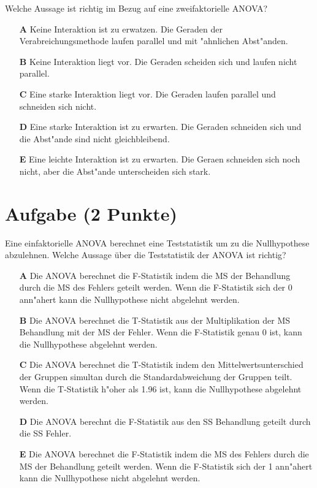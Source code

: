 \documentclass[a4paper, 10pt]{scrartcl}\usepackage[]{graphicx}\usepackage[]{xcolor}
\begin{document}
Welche Aussage ist richtig im Bezug auf eine zweifaktorielle ANOVA?



\begin{enumerate}
\item [\textbf{A} \msquare] Keine Interaktion ist zu erwatzen. Die Geraden der Verabreichungsmethode laufen parallel und mit {"a}hnlichen Abst{"a}nden.
\item [\textbf{B} \msquare] Keine Interaktion liegt vor. Die Geraden scheiden sich und laufen nicht parallel.
\item [\textbf{C} \msquare] Eine starke Interaktion liegt vor. Die Geraden laufen parallel und schneiden sich nicht.
\item [\textbf{D} \msquare] Eine starke Interaktion ist zu erwarten. Die Geraden schneiden sich und die Abst{"a}nde sind nicht gleichbleibend.
\item [\textbf{E} \msquare] Eine leichte Interaktion ist zu erwarten. Die Geraen schneiden sich noch nicht, aber die Abst{"a}nde unterscheiden sich stark.
\end{enumerate} 

\section{Aufgabe \hfill (2 Punkte)}

Eine einfaktorielle ANOVA berechnet eine Teststatistik um zu die Nullhypothese abzulehnen. Welche Aussage {\"u}ber die Teststatistik der ANOVA ist richtig?



\begin{enumerate}
\item [\textbf{A} \msquare] Die ANOVA berechnet die F-Statistik indem die MS der Behandlung durch die MS des Fehlers geteilt werden. Wenn die F-Statistik sich der 0 ann{"a}hert kann die Nullhypothese nicht abgelehnt werden.
\item [\textbf{B} \msquare] Die ANOVA berechnet die T-Statistik aus der Multiplikation der MS Behandlung mit der MS der Fehler. Wenn die F-Statistik genau 0 ist, kann die Nullhypothese abgelehnt werden.
\item [\textbf{C} \msquare] Die ANOVA berechnet die T-Statistik indem den Mittelwertsunterschied der Gruppen simultan durch die Standardabweichung der Gruppen teilt. Wenn die T-Statistik h{"o}her als 1.96 ist, kann die Nullhypothese abgelehnt werden.
\item [\textbf{D} \msquare] Die ANOVA berechnt die F-Statistik aus den SS Behandlung geteilt durch die SS Fehler.
\item [\textbf{E} \msquare] Die ANOVA berechnet die F-Statistik indem die MS des Fehlers durch die MS der Behandlung geteilt werden. Wenn die F-Statistik sich der 1 ann{"a}hert kann die Nullhypothese nicht abgelehnt werden.
\end{enumerate} 
\end{document}
